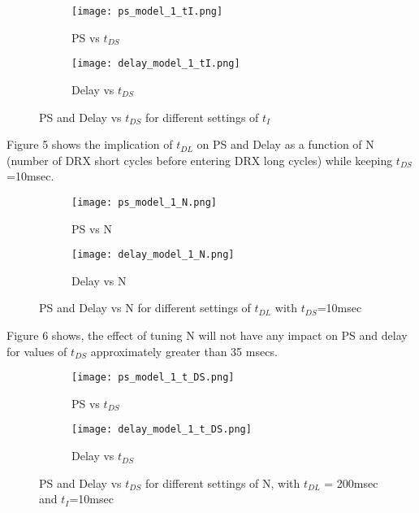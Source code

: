 \documentclass[8pt]{article}
\begin{document}
\begin{figure}[h!]
\centering
\begin{subfigure}{.5\textwidth}
  \centering
  \texttt{[image: ps\_model\_1\_tI.png]}
  \caption{ PS vs \(t_{DS}\)}
  \label{fig:sub1}
\end{subfigure}%
\begin{subfigure}{.5\textwidth}
  \centering
  \texttt{[image: delay\_model\_1\_tI.png]}
  \caption{Delay vs \(t_{DS}\)}
  \label{fig:sub2}
\end{subfigure}
\caption{PS and Delay vs \(t_{DS}\) for different settings of  \(t_{I}\)}
\label{fig:test}
\end{figure}


Figure 5 shows the implication of \(t_{DL}\) on PS and Delay as a function of N (number of DRX short cycles before entering DRX long cycles) while keeping \(t_{DS}\)=10msec.

\newpage

\begin{figure}[h!]
\centering
\begin{subfigure}{.5\textwidth}
  \centering
  \texttt{[image: ps\_model\_1\_N.png]}
  \caption{ PS vs N}
  \label{fig:sub1}
\end{subfigure}%
\begin{subfigure}{.5\textwidth}
  \centering
  \texttt{[image: delay\_model\_1\_N.png]}
  \caption{Delay vs N }
  \label{fig:sub2}
\end{subfigure}
\caption{PS and Delay vs N for different settings of  \(t_{DL}\) with \(t_{DS}\)=10msec}
\label{fig:test}
\end{figure}

Figure 6 shows, the effect of tuning N will not have any impact on PS and delay for values of \(t_{DS}\) approximately greater than 35 msecs. 

\begin{figure}[h!]
\centering
\begin{subfigure}{.5\textwidth}
  \centering
  \texttt{[image: ps\_model\_1\_t\_DS.png]}
  \caption{ PS vs \(t_{DS}\)}
  \label{fig:sub1}
\end{subfigure}%
\begin{subfigure}{.5\textwidth}
  \centering
  \texttt{[image: delay\_model\_1\_t\_DS.png]}
  \caption{Delay vs \(t_{DS}\) }
  \label{fig:sub2}
\end{subfigure}
\caption{PS and Delay vs \(t_{DS}\) for different settings of N, with \(t_{DL}\) = 200msec and \(t_{I}\)=10msec}
\label{fig:test}
\end{figure}
\end{document}
